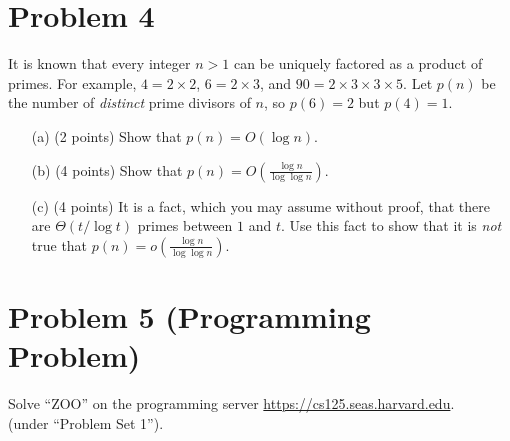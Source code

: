 \documentclass[12pt]{article}
\begin{document}
\section*{Problem 4}
It is known that every integer $n>1$ can be uniquely factored as a product of primes. For example, $4 = 2\times 2$, $6 = 2\times 3$, and $90 = 2\times 3\times 3\times 5$. Let $p(n)$ be the number of {\em distinct} prime divisors of $n$, so $p(6) = 2$ but $p(4) = 1$.
\begin{itemize}
\item[(a)] (2 points) Show that $p(n) = O(\log n)$.
\item[(b)] (4 points) Show that $p(n) = O(\frac{\log n}{\log\log n})$.
\item[(c)] (4 points) It is a fact, which you may assume without proof, that there are $\Theta(t/\log t)$ primes between $1$ and $t$. Use this fact to show that it is {\em not} true that $p(n) = o(\frac{\log n}{\log\log n})$.
\end{itemize}


\section*{Problem 5 (Programming Problem)}
Solve ``ZOO'' on the programming server \url{https://cs125.seas.harvard.edu}.\\
(under ``Problem Set 1'').
\end{document}

